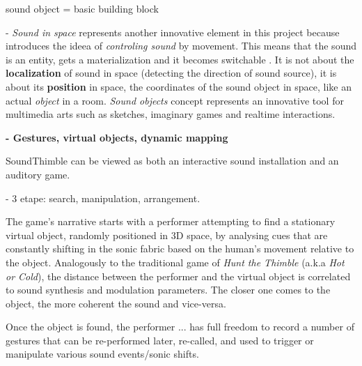 \documentclass{nime-alternate}
\begin{document}
sound object = basic building block ~\cite{schaeffer}

- \textit{Sound in space} represents another innovative element in this project because introduces the ideea of \textit{controling sound} by movement.
This means that the sound is an entity, gets a materialization and it becomes switchable \cite{soundunseen}. It is not about the \textbf{localization} of sound in space (detecting the direction of sound source), it is about its \textbf{position} in space, the coordinates of the sound object in space, like an actual \textit{object} in a room. \textit{Sound objects} concept represents an innovative tool for multimedia arts such as sketches, imaginary games and realtime interactions.

\textbf{- Gestures, virtual objects, dynamic mapping}\\ \par

SoundThimble can be viewed as both an interactive sound installation and an auditory game.

- 3 etape: search, manipulation, arrangement.


The game's narrative starts with a performer attempting to find a stationary virtual object, randomly positioned in 3D space, by analysing cues that are constantly shifting in the sonic fabric based on the human's movement relative to the object. Analogously to the traditional game of \textit{Hunt the Thimble} (a.k.a \textit{Hot or Cold}), the distance between the performer and the virtual object is correlated to sound synthesis and modulation parameters. The closer one comes to the object, the more coherent the sound and vice-versa. 

Once the object is found, the performer ... has full freedom to record a number of gestures that can be re-performed later, re-called, and used to trigger or manipulate various sound events/sonic shifts. 



\end{document}
